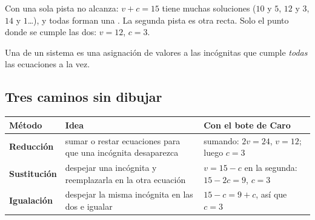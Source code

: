 \documentclass[11pt,a4paper]{article}
\begin{document}
\begin{minipage}[c]{0.5\linewidth}
Con una sola pista no alcanza: $v+c=15$ tiene muchas soluciones ($10$ y $5$, $12$ y $3$, $14$ y $1$\dots), y todas
forman una . La segunda pista es otra recta. Solo el punto donde se  cumple las dos:
$v=12$, $c=3$.
\begin{definicion}
Una  de un sistema es una asignación de valores a las incógnitas que cumple \emph{todas} las
ecuaciones a la vez.
\end{definicion}
\end{minipage}\hfill
\begin{minipage}[c]{0.46\linewidth}\centering
{}
\end{minipage}

\subsection{Tres caminos sin dibujar}
\begin{center}
\begin{tabularx}{\linewidth}{@{}>{\bfseries}l L L@{}}
\toprule
Método & Idea & Con el bote de Caro\\ \midrule
Reducción & sumar o restar ecuaciones para que una incógnita desaparezca & sumando: $2v=24$, $v=12$; luego $c=3$\\
Sustitución & despejar una incógnita y reemplazarla en la otra ecuación & $v=15-c$ en la segunda: $15-2c=9$, $c=3$\\
Igualación & despejar la misma incógnita en las dos e igualar & $15-c=9+c$, así que $c=3$\\
\bottomrule
\end{tabularx}
\end{center}
\end{document}
